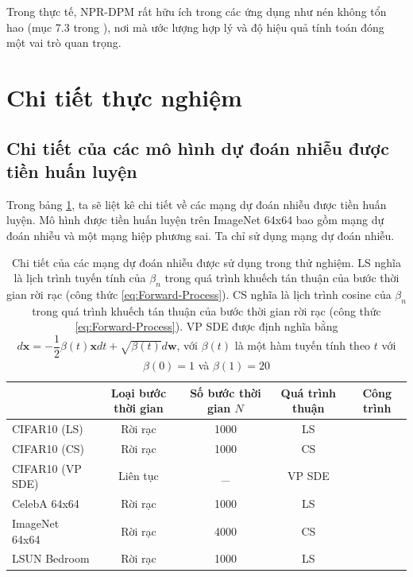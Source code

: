 \documentclass[14pt, a4paper]{article}
\numberwithin{equation}{section}
\numberwithin{figure}{section}
\numberwithin{dl}{section}
\numberwithin{md}{section}
\numberwithin{bd}{section}
\numberwithin{dn}{section}
\numberwithin{hq}{section}
\begin{document}
    Trong thực tế, NPR-DPM rất hữu ích trong các ứng dụng như nén không tổn hao (mục 7.3 trong \cite{kingma2021variational}),
    nơi mà ước lượng hợp lý và độ hiệu quả tính toán đóng một vai trò quan trọng.

    \section{Chi tiết thực nghiệm} \label{Experimental-Details}

    \subsection{Chi tiết của các mô hình dự đoán nhiễu được tiền huấn luyện}

    Trong bảng \ref{table:Details-of-Pretrained-Noise-Prediction-Network}, ta sẽ liệt kê chi tiết về các mạng dự đoán nhiễu được tiền huấn luyện.
    Mô hình được tiền huấn luyện trên ImageNet 64x64 bao gồm mạng dự đoán nhiễu và một mạng hiệp phương sai.
    Ta chỉ sử dụng mạng dự đoán nhiễu.

    \begin{table}[h!] 
        \caption{Chi tiết của các mạng dự đoán nhiễu được sử dụng trong thử nghiệm.
        LS nghĩa là lịch trình tuyến tính của $\beta_n$ trong quá trình khuếch tán thuận của bước thời gian rời rạc (công thức \ref{eq:Forward-Process}).
        CS nghĩa là lịch trình cosine của $\beta_n$ \cite{nichol2021improved} trong quá trình khuếch tán thuận của bước thời gian rời rạc (công thức \ref{eq:Forward-Process}).
        VP SDE được định nghĩa bằng $d \boldsymbol{x}=- \dfrac{1}{2} \beta(t) \boldsymbol{x} dt + \sqrt{\beta(t)} d \boldsymbol{w}$, với $\beta (t)$ là một hàm tuyến tính theo $t$ với $\beta(0)=1$ và $\beta(1)=20$ \cite{song2020score}}
        \begin{tabular}{l c c c c}
            \hline
            & Loại bước thời gian & Số bước thời gian $N$ & Quá trình thuận & Công trình \\
            \hline
            CIFAR10 (LS) & Rời rạc & 1000 & LS & \cite{bao2021analytic} \\
            CIFAR10 (CS) & Rời rạc & 1000 & CS & \cite{bao2021analytic} \\
            CIFAR10 (VP SDE) & Liên tục & \_ & VP SDE & \cite{song2020score} \\
            CelebA 64x64 & Rời rạc & 1000 & LS & \cite{song2020denoising} \\
            ImageNet 64x64 & Rời rạc & 4000 & CS & \cite{nichol2021improved} \\
            LSUN Bedroom & Rời rạc & 1000 & LS & \cite{ho2020denoising} \\
            \hline
        \end{tabular}
        \label{table:Details-of-Pretrained-Noise-Prediction-Network}
    \end{table}
\end{document}
